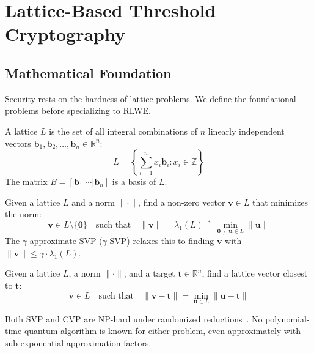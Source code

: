 \section{Lattice-Based Threshold Cryptography}


\subsection{Mathematical Foundation}

Security rests on the hardness of lattice problems. We define the
foundational problems before specializing to RLWE.

\begin{definition}[Lattice]
A lattice $L$ is the set of all integral combinations of $n$ linearly
independent vectors $\mathbf{b}_1, \mathbf{b}_2, \ldots, \mathbf{b}_n
\in \mathbb{R}^n$:
\[
L = \left\{ \sum_{i=1}^{n} x_i \mathbf{b}_i : x_i \in \mathbb{Z}
\right\}
\]
The matrix $B = [\mathbf{b}_1 | \cdots | \mathbf{b}_n]$ is a basis
of $L$.
\end{definition}

\begin{definition}
Given a lattice $L$ and a norm $\|\cdot\|$, find a non-zero vector
$\mathbf{v} \in L$ that minimizes the norm:
\[
\mathbf{v} \in L \setminus \{\mathbf{0}\} \quad\text{such that}\quad
\|\mathbf{v}\| = \lambda_1(L) \triangleq
\min_{\mathbf{0} \neq \mathbf{u} \in L} \|\mathbf{u}\|
\]
The $\gamma$-approximate SVP ($\gamma$-SVP) relaxes this to finding
$\mathbf{v}$ with $\|\mathbf{v}\| \leq \gamma \cdot \lambda_1(L)$.
\end{definition}

\begin{definition}
Given a lattice $L$, a norm $\|\cdot\|$, and a target
$\mathbf{t} \in \mathbb{R}^n$, find a lattice vector closest
to $\mathbf{t}$:
\[
\mathbf{v} \in L \quad\text{such that}\quad
\|\mathbf{v} - \mathbf{t}\| =
\min_{\mathbf{u} \in L} \|\mathbf{u} - \mathbf{t}\|
\]
\end{definition}

Both SVP and CVP are NP-hard under randomized
reductions~\cite{ajtai1996}. No polynomial-time quantum algorithm is
known for either problem, even approximately with sub-exponential
approximation factors.

